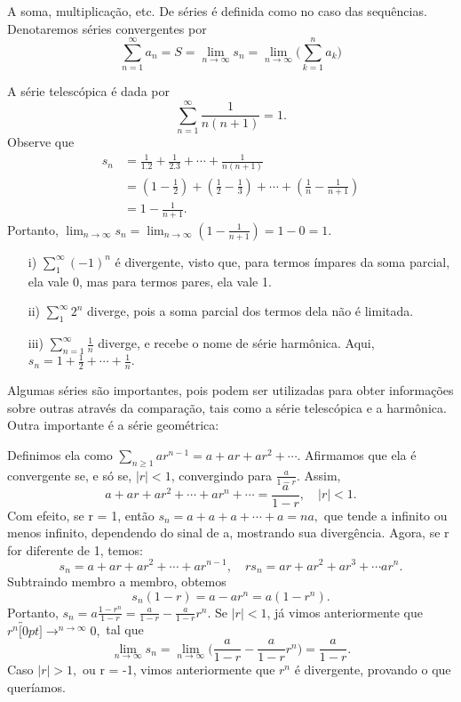 \documentclass[Analysis/analysis_notes.tex]{subfiles}
\begin{document}
  A soma, multiplica\c c\~ao, etc. De s\'eries \'e definida como no caso das sequ\^encias. Denotaremos s\'eries convergentes por 
    $$
      \sum\limits_{n=1}^{\infty}a_{n} = S = \lim_{n\to\infty}s_{n} = \lim_{n\to\infty}\biggl(\sum\limits_{k=1}^{n}a_{k}\biggr)
    $$
   \begin{example}
     A s\'erie telesc\'opica \'e dada por 
       $$
         \sum\limits_{n=1}^{\infty}\frac{1}{n(n+1)} = 1.
       $$
     Observe que 
     \begin{align*}
       s_{n} &= \frac{1}{1.2} + \frac{1}{2.3} + \cdots + \frac{1}{n(n+1)}\\
             &= (1-\frac{1}{2}) + (\frac{1}{2}-\frac{1}{3}) + \cdots + (\frac{1}{n} - \frac{1}{n+1})\\
             &= 1 - \frac{1}{n+1}.
      \end{align*}
    Portanto, $\lim_{n\to\infty}s_{n} = \lim_{n\to\infty}(1 - \frac{1}{n+1}) = 1 - 0 = 1.$ \qedsymbol
   \end{example}
  \begin{example}
   \begin{itemize}
     \item[i)]$\sum\limits_{1}^{\infty}(-1)^{n}$ \'e divergente, visto que, para termos \'impares da soma parcial, ela vale 0, mas para termos pares,
    ela vale 1.
     \item[ii)]$\sum\limits_{1}^{\infty}2^{n}$ diverge, pois a soma parcial dos termos dela n\~ao \'e limitada.
     \item[iii)]$\sum\limits_{n=1}^{\infty}\frac{1}{n}$ diverge, e recebe o nome de s\'erie harm\^onica. Aqui, $s_{n} = 1 + \frac{1}{2}+\cdots+\frac{1}{n}.$
   \end{itemize}
  \end{example}
  Algumas s\'eries s\~ao importantes, pois podem ser utilizadas para obter informa\c c\~oes sobre outras atrav\'es da compara\c c\~ao, tais como a 
  s\'erie telesc\'opica e a harm\^onica. Outra importante \'e a s\'erie geom\'etrica:
 \begin{example}
   Definimos ela como $\sum\limits_{n\geq{1}}^{}ar^{n-1} = a + ar + ar^{2} + \cdots$. Afirmamos que ela \'e convergente se, e s\'o se,
  $|r| < 1$, convergindo para $\frac{a}{1-r}$. Assim, 
    $$
      a + ar + ar^{2} + \cdots + ar^{n} + \cdots = \frac{a}{1-r}, \quad |r| < 1.
    $$
    Com efeito, se r = 1, ent\~ao $s_{n} = a + a + a + \cdots + a = na,$ que tende a infinito ou menos infinito, dependendo do sinal de a, mostrando sua diverg\^encia.
Agora, se r for diferente de 1, temos: 
  $$
    s_{n} = a + ar + ar^{2} + \cdots + ar^{n-1},\quad rs_{n} = ar + ar^{2} + ar^{3} + \cdots ar^{n}.
  $$
  Subtraindo membro a membro, obtemos 
    $$
      s_{n}(1-r) = a - ar^{n} = a(1-r^{n}).
    $$
    Portanto, $s_{n} = a \frac{1-r^{n}}{1-r} = \frac{a}{1-r} - \frac{a}{1-r}r^{n}.$ Se $|r|<1$, j\'a vimos anteriormente que
  $r^{n}\overbracket[0pt]{\longrightarrow}^{n\to \infty}0,$ tal que 
    $$
      \lim_{n\to\infty}s_{n} = \lim_{n\to\infty}\biggl(\frac{a}{1-r} - \frac{a}{1-r}r^{n}\biggr) = \frac{a}{1-r}.
    $$
    Caso $|r| > 1,$ ou r = -1, vimos anteriormente que $r^{n}$ \'e divergente, provando o que quer\'iamos. \qedsymbol
 \end{example}
\end{document}
